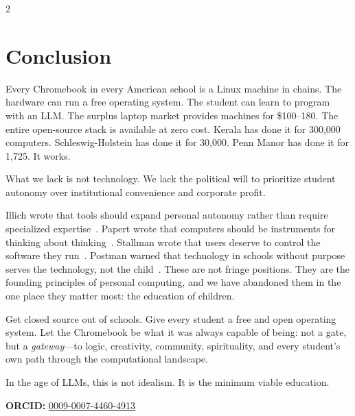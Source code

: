 \documentclass[11pt, a4paper]{article}
\begin{document}
\begin{multicols}{2}

\section{Conclusion}

Every Chromebook in every American school is a Linux machine in chains. The hardware can run a free operating system. The student can learn to program with an LLM. The surplus laptop market provides machines for \$100--180. The entire open-source stack is available at zero cost. Kerala has done it for 300,000 computers. Schleswig-Holstein has done it for 30,000. Penn Manor has done it for 1,725. It works.

What we lack is not technology. We lack the political will to prioritize student autonomy over institutional convenience and corporate profit.

Illich wrote that tools should expand personal autonomy rather than require specialized expertise~\citep{illich1973tools}. Papert wrote that computers should be instruments for thinking about thinking~\citep{papert1980mindstorms}. Stallman wrote that users deserve to control the software they run~\citep{stallman2002free}. Postman warned that technology in schools without purpose serves the technology, not the child~\citep{postman1995end}. These are not fringe positions. They are the founding principles of personal computing, and we have abandoned them in the one place they matter most: the education of children.

Get closed source out of schools. Give every student a free and open operating system. Let the Chromebook be what it was always capable of being: not a gate, but a \emph{gateway}---to logic, creativity, community, spirituality, and every student's own path through the computational landscape.

In the age of LLMs, this is not idealism. It is the minimum viable education.

\vspace{0.5em}
\noindent\textbf{ORCID:} \href{https://orcid.org/0009-0007-4460-4913}{0009-0007-4460-4913}

\end{multicols}




\end{document}
